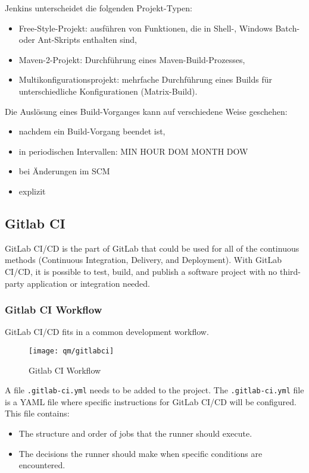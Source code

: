 Jenkins unterscheidet die folgenden Projekt-Typen:
\begin{itemize}
\item Free-Style-Projekt: ausführen von Funktionen, die in Shell-,
  Windows Batch- oder Ant-Skripts enthalten sind,
\item Maven-2-Projekt: Durchführung eines Maven-Build-Prozesses,
\item Multikonfigurationsprojekt: mehrfache Durchführung
  eines Builds für unterschiedliche Konfigurationen (Matrix-Build).
\end{itemize}
Die Auslösung eines Build-Vorganges kann auf verschiedene Weise
geschehen:
\begin{itemize}
\item nachdem ein Build-Vorgang beendet ist,
\item in periodischen Intervallen: MIN HOUR DOM MONTH DOW
\item bei Änderungen im SCM
\item explizit
\end{itemize}

\subsection{Gitlab CI}
GitLab CI/CD is the part of GitLab that could be used for all of the
continuous methods (Continuous Integration, Delivery, and Deployment).
With GitLab CI/CD, it is possible to test, build, and publish a
software project with no third-party application or integration needed.

\subsubsection{Gitlab CI Workflow}
GitLab CI/CD fits in a common development workflow.

\begin{figure}[H]
  \centering
  \texttt{[image: qm/gitlabci]}
  \caption{Gitlab CI Workflow}
\end{figure}

A file \verb|.gitlab-ci.yml| needs to be added to the project.
The \verb|.gitlab-ci.yml| file is a YAML file where
specific instructions for GitLab CI/CD will be configured.\\
This file contains:
\begin{itemize}
\item The structure and order of jobs that the runner
should execute.
\item The decisions the runner should make when specific
conditions are encountered.
\end{itemize}

